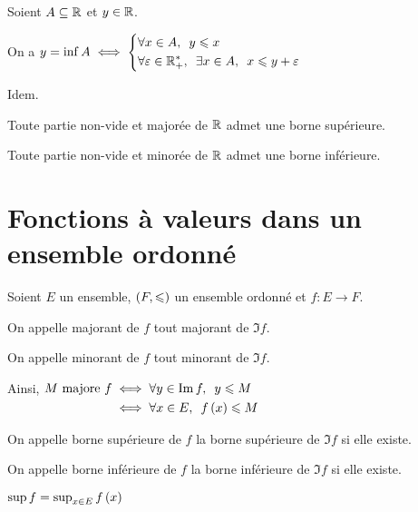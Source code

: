 \begin{theo}
Soient \(A\subseteq\mathbb{R}\) et \(y\in\mathbb{R}\).

On a \(y=\inf A\iff\begin{dcases}\quantifs{\forall x\in A}y\leq x \\ \quantifs{\forall\epsilon\in\Rps;\exists x\in A}x\leq y+\epsilon\end{dcases}\)
\end{theo}

\begin{dem}
Idem.
\end{dem}

\begin{theo}
Toute partie non-vide et majorée de \(\mathbb{R}\) admet une borne supérieure.

Toute partie non-vide et minorée de \(\mathbb{R}\) admet une borne inférieure.
\end{theo}

\begin{dem}
\end{dem}

\section{Fonctions à valeurs dans un ensemble ordonné}

\begin{defi}
Soient \(E\) un ensemble, \(\left(F,\leqslant\right)\) un ensemble ordonné et \(f:E\to F\).

On appelle majorant de \(f\) tout majorant de \(\Im f\).

On appelle minorant de \(f\) tout minorant de \(\Im f\).

Ainsi, \(\begin{aligned}[t]
M\text{ majore }f&\iff\quantifs{\forall y\in\Im f}y\leq M \\
&\iff\quantifs{\forall x\in E}f\paren{x}\leq M
\end{aligned}\)

On appelle borne supérieure de \(f\) la borne supérieure de \(\Im f\) si elle existe.

On appelle borne inférieure de \(f\) la borne inférieure de \(\Im f\) si elle existe.
\end{defi}

\begin{rem}
\(\sup f=\sup_{x\in E}f\left(x\right)\)
\end{rem}

